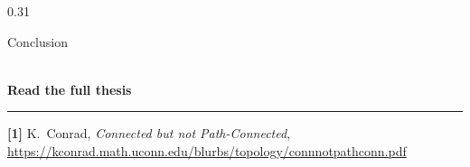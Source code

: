 \documentclass{beamer}
\begin{document}
\begin{frame}[t,fragile]
\begin{columns}[t]
\begin{column}{0.31\textwidth}
\begin{block}{Conclusion}
                \vspace{0.6cm}

                \begin{center}
                     \\
                    \vspace{0.2cm}
                    \textbf{\small Read the full thesis}
                \end{center}

                \vspace{0.1cm}
                \rule{\linewidth}{0.4pt}
                \vspace{0.1cm}

                {\small
                    \textbf{[1]} K.\ Conrad, \textit{Connected but not Path-Connected},\\
                    \url{https://kconrad.math.uconn.edu/blurbs/topology/connnotpathconn.pdf}
                }
            \end{block}

        \end{column}

    \end{columns}

\end{frame}
\end{document}

